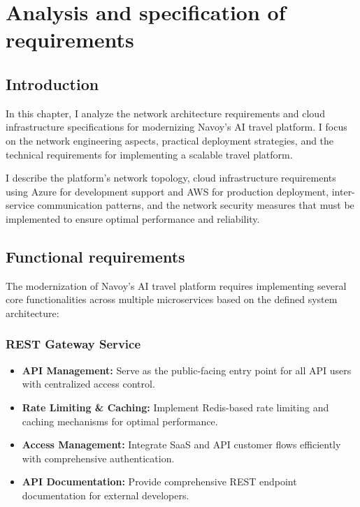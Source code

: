 \chapter{Analysis and specification of requirements}
\minitoc
\newpage

\setcounter{secnumdepth}{0} %
\section{Introduction}
In this chapter, I analyze the network architecture requirements and cloud infrastructure specifications for modernizing Navoy's AI travel platform. I focus on the network engineering aspects, practical deployment strategies, and the technical requirements for implementing a scalable travel platform.

I describe the platform's network topology, cloud infrastructure requirements using Azure for development support and AWS for production deployment, inter-service communication patterns, and the network security measures that must be implemented to ensure optimal performance and reliability.

\setcounter{secnumdepth}{2} %
\section{Functional requirements}
The modernization of Navoy's AI travel platform requires implementing several core functionalities across multiple microservices based on the defined system architecture:

\subsection{REST Gateway Service}
\begin{itemize}
    \item \textbf{API Management:} Serve as the public-facing entry point for all API users with centralized access control.
    \item \textbf{Rate Limiting \& Caching:} Implement Redis-based rate limiting and caching mechanisms for optimal performance.
    \item \textbf{Access Management:} Integrate SaaS and API customer flows efficiently with comprehensive authentication.
    \item \textbf{API Documentation:} Provide comprehensive REST endpoint documentation for external developers.
\end{itemize}

